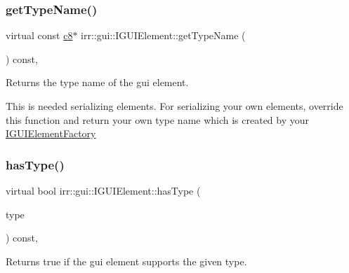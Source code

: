 \subsubsection{\texorpdfstring{get\+Type\+Name()}{getTypeName()}\hspace{0.1cm}{\footnotesize\ttfamily [2/2]}}
{\footnotesize\ttfamily virtual const \hyperlink{namespaceirr_a9395eaea339bcb546b319e9c96bf7410}{c8}$\ast$ irr\+::gui\+::\+I\+G\+U\+I\+Element\+::get\+Type\+Name (\begin{DoxyParamCaption}{ }\end{DoxyParamCaption}) const\hspace{0.3cm}{\ttfamily [inline]}, {\ttfamily [virtual]}}



Returns the type name of the gui element. 

This is needed serializing elements. For serializing your own elements, override this function and return your own type name which is created by your \hyperlink{classirr_1_1gui_1_1IGUIElementFactory}{I\+G\+U\+I\+Element\+Factory} \mbox{\label{classirr_1_1gui_1_1IGUIElement_a3c9f0356f89f4906c7bf5a302e57f01d}} 
\subsubsection{\texorpdfstring{has\+Type()}{hasType()}\hspace{0.1cm}{\footnotesize\ttfamily [1/2]}}
{\footnotesize\ttfamily virtual bool irr\+::gui\+::\+I\+G\+U\+I\+Element\+::has\+Type (\begin{DoxyParamCaption}\item[{\hyperlink{namespaceirr_1_1gui_ae4d66df0ecf4117cdbcf9f22404bd254}{E\+G\+U\+I\+\_\+\+E\+L\+E\+M\+E\+N\+T\+\_\+\+T\+Y\+PE}}]{type }\end{DoxyParamCaption}) const\hspace{0.3cm}{\ttfamily [inline]}, {\ttfamily [virtual]}}



Returns true if the gui element supports the given type. 


